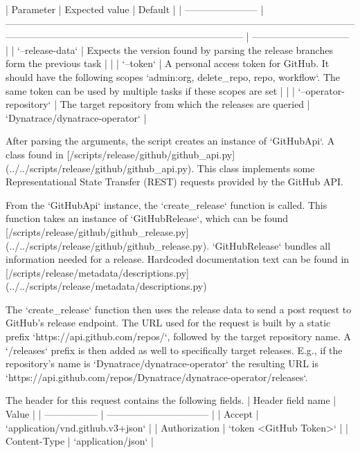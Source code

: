 | Parameter               | Expected value                                                                                                                                                                         | Default                        |
| ----------------------- | -------------------------------------------------------------------------------------------------------------------------------------------------------------------------------------- | ------------------------------ |
| `--release-data`        | Expects the version found by parsing the release branches form the previous task                                                                                                       |                                |
| `--token`               | A personal access token for GitHub. It should have the following scopes `admin:org, delete_repo, repo, workflow`. The same token can be used by multiple tasks if these scopes are set |                                |
| `--operator-repository` | The target repository from which the releases are queried                                                                                                                              | `Dynatrace/dynatrace-operator` |


After parsing the arguments, the script creates an instance of `GitHubApi`.
A class found in [/scripts/release/github/github_api.py](../../scripts/release/github/github_api.py).
This class implements some Representational State Transfer (REST) requests provided by the GitHub API.

From the `GitHubApi` instance, the `create_release` function is called.
This function takes an instance of `GitHubRelease`, which can be found [/scripts/release/github/github_release.py](../../scripts/release/github/github_release.py).
`GitHubRelease` bundles all information needed for a release.
Hardcoded documentation text can be found in [/scripts/release/metadata/descriptions.py](../../scripts/release/metadata/descriptions.py)

The `create_release` function then uses the release data to send a post request to GitHub's release endpoint.
The URL used for the request is built by a static prefix `https://api.github.com/repos/`, followed by the target repository name.
A `/releases` prefix is then added as well to specifically target releases.
E.g., if the repository's name is `Dynatrace/dynatrace-operator` the resulting URL is `https://api.github.com/repos/Dynatrace/dynatrace-operator/releases`.

The header for this request contains the following fields.
| Header field name | Value                            |
| ----------------- | -------------------------------- |
| Accept            | `application/vnd.github.v3+json` |
| Authorization     | `token <GitHub Token>`           |
| Content-Type      | `application/json`               |

